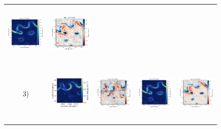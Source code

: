 \begin{bibunit}
\begin{figure}[H]
\begin{center}
\begin{tabular}{ccccc}
 \includegraphics[trim={13mm 13mm 22mm 6mm},clip, width=2.9cm,height=2.9cm]{00_Simulearning/figures/plots/glorys12-f_rec_ke.png} &
 \includegraphics[trim={13mm 13mm 22mm 6mm},clip,width=2.9cm,height=2.9cm]{00_Simulearning/figures/plots/glorys12-f_rec_vort_r.png} \\
\hspace{-10mm} 3) &
 \includegraphics[trim={0 16mm 26mm 5mm},clip, width=3.3cm,height=2.9cm]{00_Simulearning/figures/plots2/glorys12-r_train_ke.png} &
 \includegraphics[trim={13mm 13mm 22mm 6mm},clip, width=2.9cm,height=2.9cm]{00_Simulearning/figures/plots/glorys12-r_train_vort_r.png} &
 \includegraphics[trim={13mm 13mm 22mm 6mm},clip, width=2.9cm,height=2.9cm]{00_Simulearning/figures/plots/glorys12-r_rec_ke.png} &
 \includegraphics[trim={13mm 13mm 22mm 6mm},clip,width=2.9cm,height=2.9cm]{00_Simulearning/figures/plots/glorys12-r_rec_vort_r.png} \\

\end{tabular}
\end{center}
\end{figure}
\end{bibunit}

